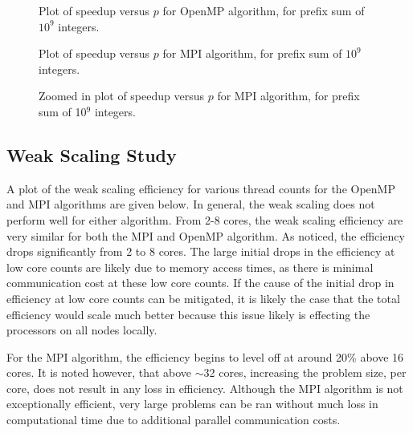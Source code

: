 \documentclass[12pt]{article}
\begin{document}
\begin{algorithm}
{{{{     \begin{figure}[htbp!]
         \centering
           \caption{Plot of speedup versus $p$ for OpenMP algorithm, for prefix sum
               of $10^9$ integers.\label{ompsu}}
     \end{figure}
\begin{figure}[htbp!]
           \centering
           \caption{Plot of speedup versus $p$ for MPI algorithm, for prefix sum of
               $10^9$ integers.\label{mpisu}}
     \end{figure}
\begin{figure}[htbp!]
           \centering
           \caption{Zoomed in plot of speedup versus $p$ for MPI
           algorithm, for prefix sum of 10$^9$ integers.\label{mpizoomsu}}
     \end{figure}

\clearpage

\subsection{Weak Scaling Study}

A plot of the weak scaling efficiency for various thread counts for the OpenMP and
MPI algorithms are given below.  In general, the weak scaling does not perform well for either
algorithm.  From 2-8 cores, the weak scaling efficiency are very similar for both the
MPI and OpenMP algorithm.  As noticed, the efficiency drops significantly from 2 to 8 cores.   The large initial
drops in the efficiency at low core counts are likely due to memory access times, as
there is minimal communication cost at these low core counts.   If the cause of the initial drop in efficiency at low core counts can be mitigated, it is likely the case that the total
efficiency would scale much better because this issue likely is effecting the
processors on all nodes locally.

For the MPI algorithm, the efficiency begins to level off at around 20\% above 16 cores.  It is noted however,
that above $\sim$32 cores, increasing the problem size, per core, does not result
in any loss in efficiency.  Although the MPI algorithm is not exceptionally
efficient, very large problems can be ran without much loss in computational time due
to additional parallel communication costs.

}}}}
\end{algorithm}
\end{document}
